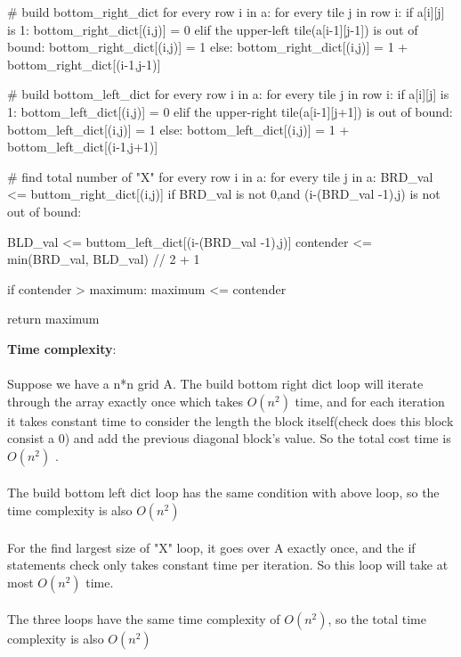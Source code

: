 \documentclass{assignment-373}
\begin{document}
\begin{enumerate}
\begin{python}
    # build bottom_right_dict
    for every row i in a:
        for every tile j in row i:
            if a[i][j] is 1:
                bottom_right_dict[(i,j)] = 0
            elif the upper-left tile(a[i-1][j-1]) is out of bound:
                bottom_right_dict[(i,j)] = 1
            else:
                bottom_right_dict[(i,j)] = 1 + bottom_right_dict[(i-1,j-1)]
                
    # build bottom_left_dict
    for every row i in a:
        for every tile j in row i:
            if a[i][j] is 1:
                bottom_left_dict[(i,j)] = 0
            elif the upper-right tile(a[i-1][j+1]) is out of bound:
                bottom_left_dict[(i,j)] = 1
            else:
                bottom_left_dict[(i,j)] = 1 + bottom_left_dict[(i-1,j+1)]
                
    # find total number of "X"
    for every row i in a:
        for every tile j in a:
            BRD_val <= buttom_right_dict[(i,j)]
            if BRD_val is not 0,and (i-(BRD_val -1),j) is not out of bound:
                
                BLD_val <= buttom_left_dict[(i-(BRD_val -1),j)]
                contender <= min(BRD_val, BLD_val) // 2 + 1
                
                if contender > maximum:
                    maximum <= contender
                                
    return maximum
    	
           \end{python}
      {\bf Time complexity}: \\
  \\
  \phantom{=} \phantom{=} Suppose we have a n*n grid A. The build bottom right dict loop will iterate through the array exactly once which takes $O(n^2)$ time, and for each iteration it takes constant time to consider the length the block itself(check does this block consist a 0) and add the previous diagonal block's value. So the total cost time is $O(n^2)$ .\\
  \\
  \phantom{=} \phantom{=} The build bottom left dict loop has the same condition with above loop, so the time complexity is also $O(n^2)$\\ 
  \\
\phantom{=} \phantom{=} For the find largest size of "X" loop, it goes over A exactly once, and the if statements check only takes constant time per iteration. So this loop will take at most $ O(n^2)$ time.\\
\\
\phantom{=} \phantom{=} The three loops have the same time complexity of $O(n^2)$, so the total time complexity is also $O(n^2)$
  \\
  

\end{enumerate}
\end{document}

